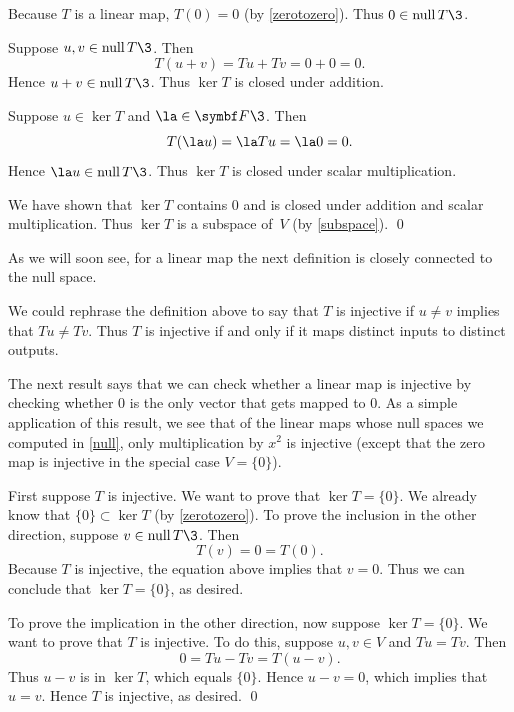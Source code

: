 \proof
Because $T$ is a linear map, $T(0) = 0$ (by \ref{zerotozero}).  Thus $0 \in \ker T\3$.

Suppose $u, v \in \ker T\3$. Then
\[
T(u + v) = Tu + Tv = 0 + 0 = 0.
\]
Hence $u + v \in \ker T\3$.  Thus $\ker T$ is closed under addition.

Suppose $u \in \ker T$ and $\la \in \F{}\3$. Then
\[
T(\la u) = \la Tu = \la 0 = 0.
\]
Hence $\la u \in \ker T\3$.  Thus $\ker T$ is closed under scalar
multiplication.

We have shown that $\ker T$ contains $0$ and is closed under
addition and scalar multiplication.  Thus $\ker T$ is a subspace of~$V$ (by \ref{subspace}).
\qed

As we will soon see, for a linear map the next definition is closely connected to the null space.



We could rephrase the definition above to say that $T$ is injective if $u \ne v$ implies that $Tu \ne Tv$. Thus $T$ is injective if and only if it maps distinct inputs to distinct outputs.

The next result says that we can check whether a linear map is
injective by checking whether $0$ is the only vector
that gets mapped to $0$. As a simple  application of this result, we see
that of the linear maps whose null spaces we computed in \ref{null}, only
multiplication by $x^2$ is injective (except that the zero map is injective in the special case $V = \{0\}$).


\proof
First suppose $T$ is injective.  We want to prove that $\ker T = \{0\}$.  We
already know that $\{0\} \subset \ker T$ (by \ref{zerotozero}).  To prove the inclusion in
the other direction, suppose $v \in \ker T\3$. Then
\[
T(v) = 0 = T(0).
\]
Because $T$ is injective, the equation above implies that $v = 0$.  Thus we can conclude that
\mbox{$\ker T = \{0\}$}, as desired.

To prove the implication in the other direction, now suppose $\ker T = \{0\}$.
We want to prove that $T$ is injective.  To
do this, suppose $u, v \in V$ and $Tu = Tv$.  Then
\[
0 = Tu - Tv = T(u - v).
\]
Thus $u - v$ is in $\ker T$, which equals $\{0\}$.  Hence $u - v = 0$, which
implies that $u = v$.  Hence $T$ is injective, as  desired.
\qed

